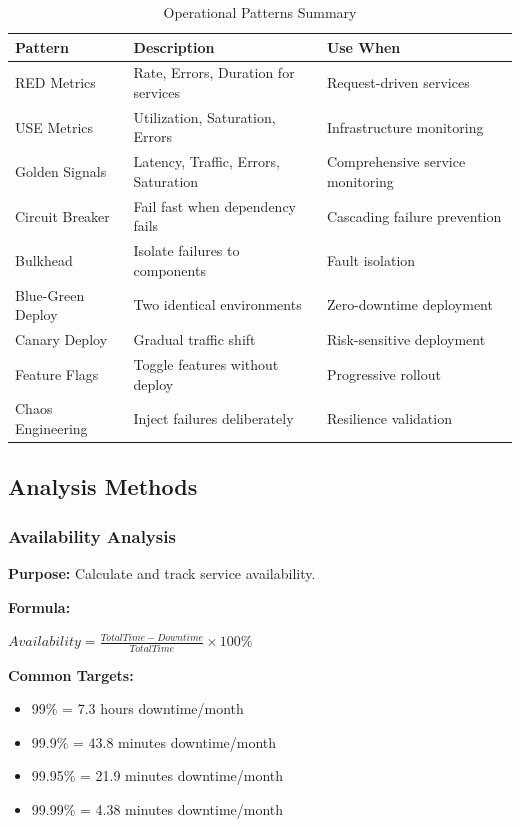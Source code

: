 \documentclass[11pt,letterpaper]{article}
\begin{document}
\begin{table}[H]
\centering
\caption{Operational Patterns Summary}
\small
\begin{tabular}{@{}L{3cm}L{4.5cm}L{5.5cm}@{}}
\toprule
\textbf{Pattern} & \textbf{Description} & \textbf{Use When} \\
\midrule
RED Metrics & Rate, Errors, Duration for services & Request-driven services \\
\addlinespace
USE Metrics & Utilization, Saturation, Errors & Infrastructure monitoring \\
\addlinespace
Golden Signals & Latency, Traffic, Errors, Saturation & Comprehensive service monitoring \\
\addlinespace
Circuit Breaker & Fail fast when dependency fails & Cascading failure prevention \\
\addlinespace
Bulkhead & Isolate failures to components & Fault isolation \\
\addlinespace
Blue-Green Deploy & Two identical environments & Zero-downtime deployment \\
\addlinespace
Canary Deploy & Gradual traffic shift & Risk-sensitive deployment \\
\addlinespace
Feature Flags & Toggle features without deploy & Progressive rollout \\
\addlinespace
Chaos Engineering & Inject failures deliberately & Resilience validation \\
\bottomrule
\end{tabular}
\end{table}

\subsection{Analysis Methods}

\subsubsection{Availability Analysis}

\begin{definitionbox}
\textbf{Purpose:} Calculate and track service availability.

\textbf{Formula:}
\begin{center}
$Availability = \frac{Total Time - Downtime}{Total Time} \times 100\%$
\end{center}

\textbf{Common Targets:}
\begin{itemize}[nosep]
    \item 99\% = 7.3 hours downtime/month
    \item 99.9\% = 43.8 minutes downtime/month
    \item 99.95\% = 21.9 minutes downtime/month
    \item 99.99\% = 4.38 minutes downtime/month
\end{itemize}
\end{definitionbox}
\end{document}

